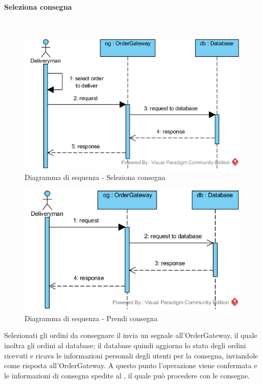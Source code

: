 \begin{samepage}
\paragraph{Seleziona consegna}\mbox{}\\
\end{samepage}
\begin{figure}[H]
	\centering
	\includegraphics[width=14cm]{../../documenti/SpecificaTecnica/diagrammi_img/sequenza/fattorino_seleziona_consegna.png}
	\caption{Diagramma di sequenza - Seleziona consegna}
\end{figure}
\begin{figure}[H]
	\centering
	\includegraphics[width=14cm]{../../documenti/SpecificaTecnica/diagrammi_img/sequenza/fattorino_prendi_consegna.png}
	\caption{Diagramma di sequenza - Prendi consegna}
\end{figure}
Selezionati gli ordini da consegnare il \Deliveryman{} invia un segnale all'Order\-Gateway, il quale inoltra gli ordini al database; il database quindi aggiorna lo stato degli ordini ricevuti e ricava le informazioni personali degli utenti per la consegna, inviandole come risposta all'Order\-Gateway. A questo punto l'operazione viene confermata e le informazioni di consegna spedite al \Deliveryman{}, il quale può procedere con le consegne.

